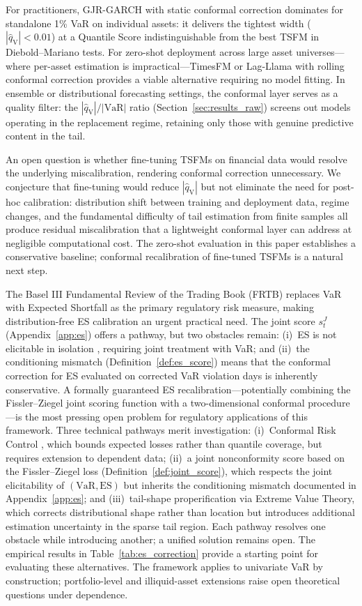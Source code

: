 \documentclass[preprint,11pt,authoryear]{elsarticle}
\newcommand{\VaR}{\mathrm{VaR}}
\newcommand{\ES}{\mathrm{ES}}
\newcommand{\1}{\boldsymbol{1}}
\newcommand{\qV}{\hat{q}_{\scriptscriptstyle\mathrm{V}}}
\begin{document}
	For practitioners, GJR-GARCH with static conformal correction
	dominates for standalone 1\% VaR on individual assets: it
	delivers the tightest width ($|\qV| < 0.01$) at a Quantile
	Score indistinguishable from the best TSFM in Diebold--Mariano
	tests. For zero-shot deployment across large asset
	universes---where per-asset estimation is impractical---TimesFM
	or Lag-Llama with rolling conformal correction provides a viable
	alternative requiring no model fitting. In ensemble or
	distributional forecasting settings, the conformal layer serves
	as a quality filter: the $|\qV|/|\VaR|$ ratio
	(Section~\ref{sec:results_raw}) screens out models operating in
	the replacement regime, retaining only those with genuine
	predictive content in the tail.

	An open question is whether fine-tuning TSFMs on financial
	data would resolve the underlying miscalibration, rendering
	conformal correction unnecessary. We conjecture that
	fine-tuning would reduce $|\qV|$ but not eliminate the need
	for post-hoc calibration: distribution shift between training
	and deployment data, regime changes, and the fundamental
	difficulty of tail estimation from finite samples all produce
	residual miscalibration that a lightweight conformal layer can
	address at negligible computational cost. The zero-shot
	evaluation in this paper establishes a conservative baseline;
	conformal recalibration of fine-tuned TSFMs is a natural next
	step.
	
	The Basel III Fundamental Review of the Trading Book (FRTB)
	replaces VaR with Expected Shortfall as the primary regulatory
	risk measure, making distribution-free ES calibration an urgent
	practical need. The joint score $s^J_t$ (Appendix~\ref{app:es})
	offers a pathway, but two obstacles remain: (i)~ES is not
	elicitable in isolation \citep{gneiting2011making}, requiring
	joint treatment with VaR; and (ii)~the conditioning mismatch
	(Definition~\ref{def:es_score}) means that the conformal
	correction for ES evaluated on corrected VaR violation days is
	inherently conservative. A formally guaranteed ES
	recalibration---potentially combining the Fissler--Ziegel joint
	scoring function with a two-dimensional conformal
	procedure---is the most pressing open problem for regulatory
	applications of this framework. Three technical pathways merit
	investigation: (i)~Conformal Risk Control
	\citep{angelopoulos2024conformal}, which bounds expected losses
	rather than quantile coverage, but requires extension to
	dependent data; (ii)~a joint nonconformity score based on the
	Fissler--Ziegel loss (Definition~\ref{def:joint_score}), which
	respects the joint elicitability of $(\VaR, \ES)$ but inherits
	the conditioning mismatch documented in
	Appendix~\ref{app:es}; and (iii)~tail-shape properification via
	Extreme Value Theory, which corrects distributional shape rather
	than location but introduces additional estimation uncertainty
	in the sparse tail region. Each pathway resolves one obstacle
	while introducing another; a unified solution remains open. The
	empirical results in Table~\ref{tab:es_correction} provide a
	starting point for evaluating these alternatives.
	The framework applies to univariate VaR by
	construction; portfolio-level and illiquid-asset extensions
	raise open theoretical questions under dependence.
	
\end{document}
